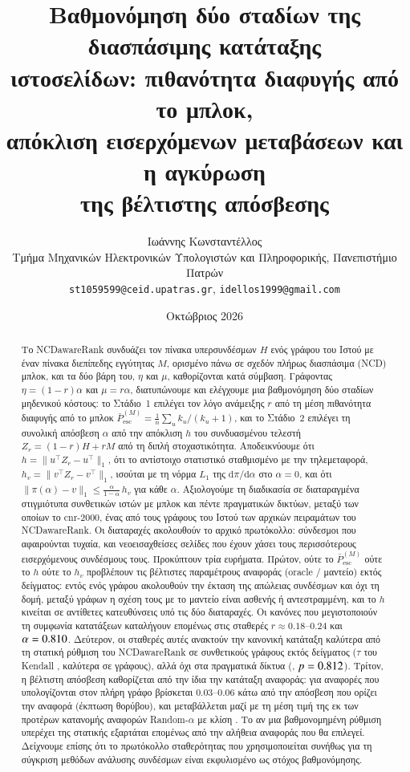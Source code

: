 \documentclass[11pt,a4paper]{article}
\title{\bfseries Βαθμονόμηση δύο σταδίων της διασπάσιμης κατάταξης\\
ιστοσελίδων: πιθανότητα διαφυγής από το μπλοκ,\\
απόκλιση εισερχόμενων μεταβάσεων και η αγκύρωση\\
της βέλτιστης απόσβεσης}
\author{Ιωάννης Κωνσταντέλλος\\[2pt]
\small Τμήμα Μηχανικών Ηλεκτρονικών Υπολογιστών και Πληροφορικής, Πανεπιστήμιο Πατρών\\
\small\texttt{st1059599@ceid.upatras.gr}, \texttt{idellos1999@gmail.com}}
\date{Οκτώβριος 2026}
\theoremstyle{definition}
\theoremstyle{remark}
\newcommand{\Pbar}{\bar P^{(M)}_{\mathrm{esc}}}
\begin{document}
\maketitle

\begin{abstract}
\noindent
Το NCDawareRank συνδυάζει τον πίνακα υπερσυνδέσμων $H$ ενός γράφου του Ιστού με έναν πίνακα
διεπίπεδης εγγύτητας $M$, ορισμένο πάνω σε σχεδόν πλήρως διασπάσιμα (NCD) μπλοκ, και τα δύο βάρη
του, $\eta$ και $\mu$, καθορίζονται κατά σύμβαση. Γράφοντας $\eta=(1-r)\alpha$ και $\mu=r\alpha$,
διατυπώνουμε και ελέγχουμε μια βαθμονόμηση δύο σταδίων μηδενικού κόστους: το Στάδιο~1 επιλέγει τον
λόγο ανάμειξης $r$ από τη μέση πιθανότητα διαφυγής από το μπλοκ $\Pbar=\frac1n\sum_u k_u/(k_u+1)$,
και το Στάδιο~2 επιλέγει τη συνολική απόσβεση $\alpha$ από την απόκλιση $h$ του συνδυασμένου τελεστή
$Z_r=(1-r)H+rM$ από τη διπλή στοχαστικότητα. Αποδεικνύουμε ότι $h=\|u^\top Z_r-u^\top\|_1$, ότι το
αντίστοιχο στατιστικό σταθμισμένο με την τηλεμεταφορά, $h_v=\|v^\top Z_r-v^\top\|_1$, ισούται με τη
νόρμα $L_1$ της $\mathrm d\pi/\mathrm d\alpha$ στο $\alpha=0$, και ότι
$\|\pi(\alpha)-v\|_1\le\frac{\alpha}{1-\alpha}\,h_v$ για κάθε $\alpha$. Αξιολογούμε τη διαδικασία σε
\nInstTotal{} διαταραγμένα στιγμιότυπα συνθετικών ιστών με μπλοκ και πέντε πραγματικών δικτύων,
μεταξύ των οποίων το cnr-2000, ένας από τους γράφους του Ιστού των αρχικών πειραμάτων του
NCDawareRank. Οι διαταραχές ακολουθούν το αρχικό πρωτόκολλο: σύνδεσμοι που αφαιρούνται τυχαία, και
νεοεισαχθείσες σελίδες που έχουν χάσει τους περισσότερους εισερχόμενους συνδέσμους τους.
Προκύπτουν τρία ευρήματα. Πρώτον, ούτε το $\Pbar$ ούτε το $h$ ούτε το $h_v$ προβλέπουν τις βέλτιστες
παραμέτρους αναφοράς (oracle / μαντείο) εκτός δείγματος: εντός ενός γράφου ακολουθούν την έκταση της απώλειας
συνδέσμων και όχι τη δομή, μεταξύ γράφων η σχέση τους με το μαντείο είναι ασθενής ή αντεστραμμένη, και
το $h$ κινείται σε αντίθετες κατευθύνσεις υπό τις δύο διαταραχές. Οι κανόνες που μεγιστοποιούν τη
συμφωνία κατατάξεων καταλήγουν επομένως στις σταθερές $r\approx0.18$--$0.24$ και
$\alpha=0.810$. Δεύτερον, οι σταθερές αυτές ανακτούν την κανονική κατάταξη καλύτερα από τη
στατική ρύθμιση του NCDawareRank σε συνθετικούς γράφους εκτός δείγματος ($\tau$ του Kendall
\TwoTestD, καλύτερα σε \TwoTestWins{} γράφους), αλλά όχι στα πραγματικά δίκτυα (\TwoRealD,
$p=0.812$). Τρίτον, η βέλτιστη απόσβεση καθορίζεται από την ίδια την κατάταξη αναφοράς: για αναφορές που
υπολογίζονται στον πλήρη γράφο βρίσκεται $0.03$--$0.06$ κάτω από την απόσβεση που ορίζει την αναφορά
(έκπτωση θορύβου), και μεταβάλλεται μαζί με τη μέση τιμή της εκ των προτέρων κατανομής αναφορών
Random-$\alpha$ με κλίση \RaprSlope. Το αν μια
βαθμονομημένη ρύθμιση υπερέχει της στατικής εξαρτάται επομένως από την αλήθεια αναφοράς που θα
επιλεγεί. Δείχνουμε επίσης ότι το πρωτόκολλο σταθερότητας που χρησιμοποιείται συνήθως για τη σύγκριση
μεθόδων ανάλυσης συνδέσμων είναι εκφυλισμένο ως στόχος βαθμονόμησης.
\end{abstract}
\end{document}

